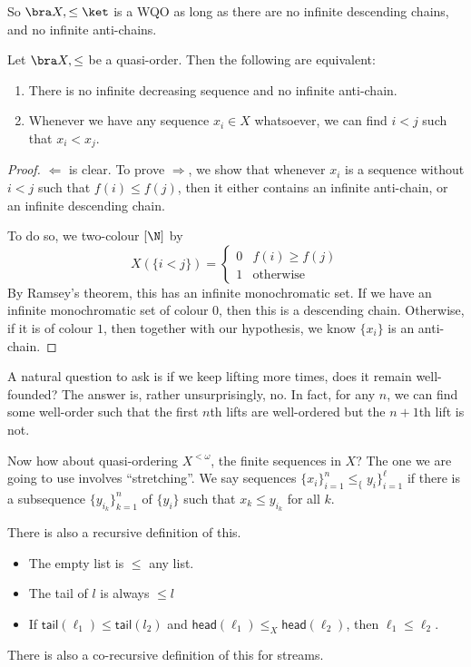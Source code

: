 \documentclass[a4paper]{article}
\newcommand\head{\mathsf{head}}
\newcommand\tail{\mathsf{tail}}
\begin{document}
So $ \bra X, \leq\ket$ is a WQO as long as there are no infinite descending chains, and no infinite anti-chains. %

\begin{prop}
  Let $\bra X, \leq$ be a quasi-order. Then the following are equivalent:
  \begin{enumerate}
    \item There is no infinite decreasing sequence and no infinite anti-chain.
    \item Whenever we have any sequence $x_i \in X$ whatsoever, we can find $i < j$ such that $x_i < x_j$.
  \end{enumerate}
\end{prop}

\begin{proof}
  $\Leftarrow$ is clear. To prove $\Rightarrow$, we show that whenever $x_i$ is a sequence without $i < j$ such that $f(i) \leq f(j)$, then it either contains an infinite anti-chain, or an infinite descending chain.

  To do so, we two-colour $[\N]$ by
  \[
    X(\{i < j\}) =
    \begin{cases}
      0 & f(i) \geq f(j)\\
      1 & \text{otherwise}
    \end{cases}
  \]
  By Ramsey's theorem, this has an infinite monochromatic set. If we have an infinite monochromatic set of colour $0$, then this is a descending chain. Otherwise, if it is of colour $1$, then together with our hypothesis, we know $\{x_i\}$ is an anti-chain.
\end{proof}

A natural question to ask is if we keep lifting more times, does it remain well-founded? The answer is, rather unsurprisingly, no. In fact, for any $n$, we can find some well-order such that the first $n$th lifts are well-ordered but the $n + 1$th lift is not.

Now how about quasi-ordering $X^{<\omega}$, the finite sequences in $X$? The one we are going to use involves ``stretching''. We say sequences $\{x_i\}_{i = 1}^n \leq_ \{y_i\}_{i = 1}^\ell$ if there is a subsequence $\{y_{i_k}\}_{k = 1}^n$ of $\{y_i\}$ such that $x_k \leq y_{i_k}$ for all $k$.

There is also a recursive definition of this.
\begin{itemize}
  \item The empty list is $\leq$ any list.
  \item The tail of $l$ is always $\leq l$
  \item If $\tail (\ell_1) \leq \tail(l_2)$ and $\head(\ell_1) \leq_X \head (\ell_2)$, then $\ell_1 \leq \ell_2$.
\end{itemize}
There is also a co-recursive definition of this for streams.
\printindex
\end{document}

